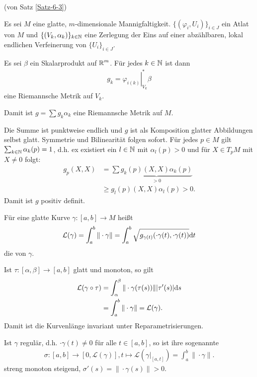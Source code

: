 \begin{bew}(von Satz \ref{Satz-6-3})

  Es sei $M$ eine glatte, $m$-dimensionale Mannigfaltigkeit. $\{(\varphi_i,U_i)\}_{i \in J}$ ein Atlat von $M$ und $\{(V_k,\alpha_k)\}_{k \in \operatorname{\mathbb{N}}}$ eine Zerlegung der Eins auf einer abzählbaren, lokal endlichen Verfeinerung von $\{U_i\}_{i \in J}$.

  Es sei $\beta$ ein Skalarprodukt auf $\operatorname{\mathbb{R}}^m$.
  Für jedes $k \in \operatorname{\mathbb{N}}$ ist dann
  \begin{align*}
    g_k = \left.\varphi_{i(k)}\right|_{V_k}^{*}\beta
  \end{align*}
  eine Riemannsche Metrik auf $V_k$.

  Damit ist $g = \sum g_k\alpha_k$ eine Riemannsche Metrik auf $M$.

  Die Summe ist punktweise endlich und $g$ ist als Komposition glatter Abbildungen selbst glatt.
  Symmetrie und Bilinearität folgen sofort.
  Für jedes $p \in M$ gilt $\sum_{k \in \operatorname{\mathbb{N}}}\alpha_k(p) = 1$, d.h. ex existiert ein $l \in \operatorname{\mathbb{N}}$ mit $\alpha_l(p) > 0$ und für $X \in T_pM$ mit $X \neq 0$ folgt:
  \begin{align*}
    g_p(X,X) & = \sum \underbrace{g_k(p)(X,X)\alpha_k(p)}_{> 0}\\
    & \geq g_l(p)(X,X)\alpha_l(p) > 0.
  \end{align*}
  Damit ist $g$ positiv definit.
\end{bew}

Für eine glatte Kurve $\gamma \colon [a,b] \to M$ heißt
\begin{align*}
  \mathcal L(\gamma) = \int_{a}^b\|\cdot \gamma\| = \int_a^b \sqrt{g_{\gamma(t)}(\cdot\gamma(t),\cdot\gamma(t))}\mathrm{d} t
\end{align*}
die  von $\gamma$.

Ist $\tau \colon [\alpha,\beta] \to [a,b]$ glatt und monoton, so gilt
\begin{align*}
  \mathcal L(\gamma \circ \tau) & = \int_{\alpha}^{\beta}\|\cdot\gamma(\tau(s))\||\tau'(s)|\mathrm{d} s\\
  & = \int_a^b\|\cdot\gamma\| = \mathcal L(\gamma).
\end{align*}
Damit ist die Kurvenlänge invariant unter Reparametrisierungen.

Ist $\gamma$ regulär, d.h. $\cdot\gamma(t) \neq 0$ für alle $t \in [a,b]$, so ist ihre sogenannte 
\begin{align*}
  \sigma \colon [a,b] \to [0,\mathcal L(\gamma)], t \mapsto \mathcal L(\gamma|_{[a,t]}) = \int_a^b\|\cdot\gamma\|.
\end{align*}
streng monoton steigend, $\sigma'(s) = \|\cdot\gamma(s)\| > 0$.

